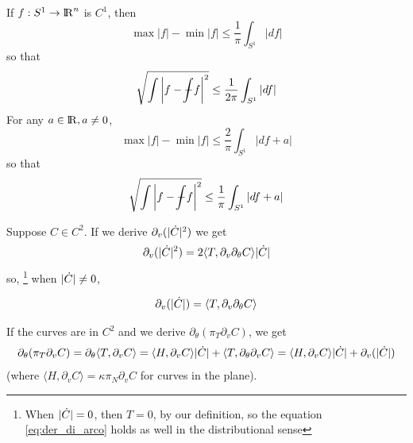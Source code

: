 \documentclass[twoside,a4paper,english]{article}
\def\derpar#1{\partial_{#1}}
\newcommand\lint{{\protect\mathrm{-\hskip-1.1em \int}}}
\begin{document}
\begin{Lemma}
  If $f:S^1\to{\protect\mathrm{l\hskip-0.15em R}}^n$ is $C^1$, then  
  \begin{equation}
    \max |f|-\min |f| \le \frac 1 \pi  \int_{S^1} |d f|
  \end{equation}
  so that 
  \begin{equation}
    \sqrt{\int \left| f-\lint f \right|^2} \le \frac 1 {2\pi} \int_{S^1} |d f|
  \end{equation}
  For any $a\in{\protect\mathrm{l\hskip-0.15em R}}, a\neq 0$, 
  \begin{equation}
    \max |f|-\min |f| \le   \frac 2 \pi  \int_{S^1} |d f+a|
    \label{eq: Poincare max min}
  \end{equation}
  so that 
  \begin{equation}
    \sqrt{\int \left| f-\lint f \right|^2} \le  \frac 1 \pi \int_{S^1} |d f+a|
    \label{eq: Poincare L^1}
  \end{equation}
\end{Lemma}

\begin{Lemma}
  \label{derivatives}
  Suppose $C\in C^2$.
  If we derive $\derpar v(|\overdot C|^2)$ we get
  $$\derpar v(|\overdot C|^2)= 2\langle T ,\derpar v\derpar\theta C
  \rangle |\overdot C|$$
  so,%
  \footnote{  When $|\overdot C|=0$, then $T=0$, by our definition, 
    so the equation \eqref{eq:der_di_arco} holds as well
    in the distributional sense}
  when $|\overdot C|\neq 0$,
  
  \begin{equation}
    \label{eq:der_di_arco}
    \derpar v (|\overdot C|)= \langle T ,\derpar v\derpar\theta C  \rangle    
  \end{equation}  

  If the curves are in $C^2$ and
  we derive $\derpar\theta (\pi_T \derpar v C)$, we get  
  \begin{equation}
    \label{eq:der_di_pi_N_d_v}
    \derpar\theta (\pi_T \derpar v C)= 
    \derpar\theta\langle T ,\derpar v C \rangle= 
    \langle H ,\derpar v C\rangle|\overdot C|
    + \langle T,\derpar \theta\derpar v C  \rangle= 
    \langle H ,\derpar v C\rangle|\overdot C|
    +   \derpar v (|\overdot C|)
  \end{equation}
  (where $\langle H ,\derpar v C\rangle=  \kappa \pi_N\derpar v C$
  for curves in the plane).
\end{Lemma}
\end{document}
